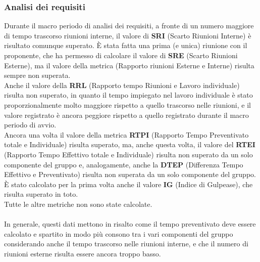 \subsubsection{Analisi dei requisiti}
Durante il macro periodo di analisi dei requisiti, a fronte di un numero maggiore di tempo trascorso riunioni interne, il valore di \textbf{SRI} (Scarto Riunioni Interne) è risultato comunque superato. È stata fatta una prima (e unica) riunione con il proponente, che ha permesso di calcolare il valore di \textbf{SRE} (Scarto Riunioni Esterne), ma il valore della metrica (Rapporto riunioni Esterne e Interne) risulta sempre non superata.\\
Anche il valore della \textbf{RRL} (Rapporto tempo Riunioni e Lavoro individuale) risulta non superato, in quanto il tempo impiegato nel lavoro individuale è stato proporzionalmente molto maggiore rispetto a quello trascorso nelle riunioni, e il valore registrato è ancora peggiore rispetto a quello registrato durante il macro periodo di avvio. \\
Ancora una volta il valore della metrica \textbf{RTPI} (Rapporto Tempo Preventivato totale e Individuale) risulta superato, ma, anche questa volta, il valore del \textbf{RTEI} (Rapporto Tempo Effettivo totale e Individuale) risulta non superato da un solo componente del gruppo e, analogamente, anche la \textbf{DTEP} (Differenza Tempo Effettivo e Preventivato) risulta non superata da un solo componente del gruppo. \\
È stato calcolato per la prima volta anche il valore \textbf{IG} (Indice di Gulpease), che risulta superato in toto.\\
Tutte le altre metriche non sono state calcolate.\\\\
In generale, questi dati mettono in risalto come il tempo preventivato deve essere calcolato e spartito in modo più consono tra i vari componenti del gruppo considerando anche il tempo trascorso nelle riunioni interne, e che il numero di riunioni esterne risulta essere ancora troppo basso.

